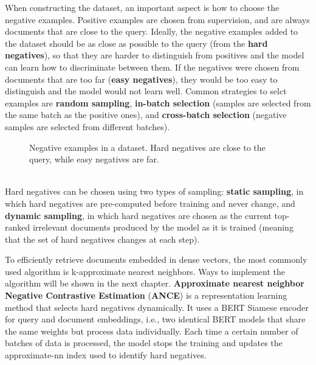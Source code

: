When constructing the dataset, an important aspect is how to choose the negative examples. Positive examples are chosen from supervision, and are always documents that are close to the query. Ideally, the negative examples added to the dataset should be as close as possible to the query (from the \textbf{hard negatives}), so that they are harder to distinguish from positives and the model can learn how to discriminate between them. If the negatives were chosen from documents that are too far (\textbf{easy negatives}), they would be too easy to distinguish and the model would not learn well. Common strategies to selct examples are \textbf{random sampling}, \textbf{in-batch selection} (samples are selected from the same batch as the positive ones), and \textbf{cross-batch selection} (negative samples are selected from different batches).
\begin{figure}[h]
    \centering 
    
    \caption{Negative examples in a dataset. Hard negatives are close to the query, while easy negatives are far.}
\end{figure} \\
Hard negatives can be chosen using two types of sampling: \textbf{static sampling}, in which hard negatives are pre-computed before training and never change, and \textbf{dynamic sampling}, in which hard negatives are chosen as the current top-ranked irrelevant documents produced by the model as it is trained (meaning that the set of hard negatives changes at each step).

To efficiently retrieve documents embedded in dense vectors, the most commonly used algorithm is k-approximate nearest neighbors. Ways to implement the algorithm will be shown in the next chapter. \textbf{Approximate nearest neighbor Negative Contrastive Estimation} (\textbf{ANCE}) is a representation learning method that selects hard negatives dynamically. It uses a BERT Siamese encoder for query and document embeddings, i.e., two identical BERT models that share the same weights but process data individually. Each time a certain number of batches of data is processed, the model stops the training and updates the approximate-nn index used to identify hard negatives.

